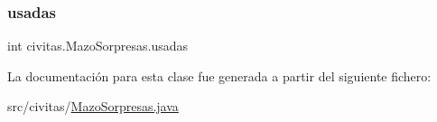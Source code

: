 \mbox{\label{classcivitas_1_1MazoSorpresas_a49a7af66f4c621ce6b5475bfb6b9090c}} 
\subsubsection{\texorpdfstring{usadas}{usadas}}
{\footnotesize\ttfamily int civitas.\+Mazo\+Sorpresas.\+usadas\hspace{0.3cm}{\ttfamily [private]}}



La documentación para esta clase fue generada a partir del siguiente fichero\+:\begin{DoxyCompactItemize}
\item 
src/civitas/\hyperlink{MazoSorpresas_8java}{Mazo\+Sorpresas.\+java}\end{DoxyCompactItemize}
